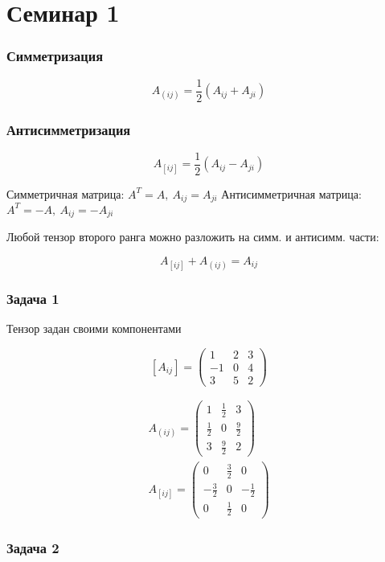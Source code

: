 \section{Семинар 1}

\subsubsection{Симметризация}

$$A_{(ij)} = \frac{1}{2}(A_{ij}+A_{ji})$$

\subsubsection{Антисимметризация}

$$A_{[ij]} = \frac{1}{2}(A_{ij}-A_{ji})$$

Симметричная матрица: \(A^{T} = A, \ A_{ij} = A_{ji}\) Антисимметричная
матрица: \(A^{T} = -A, \ A_{ij} = -A_{ji}\)

Любой тензор второго ранга можно разложить на симм. и антисимм. части:

$$A_{[ij]} + A_{(ij)} = A_{ij}$$

\subsubsection{Задача 1}

Тензор задан своими компонентами

$$[A_{ij}] = \begin{pmatrix}
1 & 2 & 3 \\
-1 & 0 & 4 \\
3 & 5 & 2
\end{pmatrix}$$

$$\begin{gather}
A_{(ij)} = \begin{pmatrix}
1 & \frac{1}{2} & 3 \\
\frac{1}{2} & 0 & \frac{9}{2} \\
3 & \frac{9}{2} & 2
\end{pmatrix} \\
A_{[ij]} = \begin{pmatrix}
0 & \frac{3}{2} & 0 \\
-\frac{3}{2} & 0 & -\frac{1}{2} \\
0 & \frac{1}{2} & 0
\end{pmatrix}
\end{gather}$$

\subsubsection{Задача 2}

